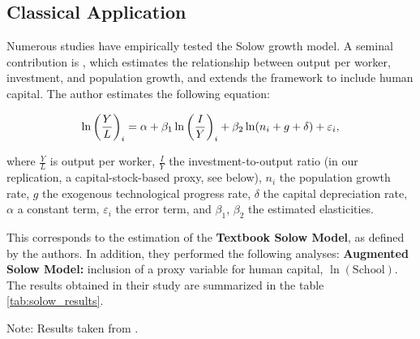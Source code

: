 \documentclass[preprint,12pt,authoryear]{sn-jnl}
\begin{document}
\subsection{Classical Application}

Numerous studies have empirically tested the Solow growth model. A seminal contribution is \cite{mankiw1992contribution}, which estimates the relationship between output per worker, investment, and population growth, and extends the framework to include human capital. The author estimates the following equation:

\begin{equation}
\setlength{\abovedisplayskip}{5pt}
\setlength{\belowdisplayskip}{5pt}
\ln\left(\frac{Y}{L}\right)_i = \alpha + \beta_1 \ln\left(\frac{I}{Y}\right)_i + \beta_2 \ln(n_i + g + \delta) + \varepsilon_i,
\end{equation}

where $\frac{Y}{L}$ is output per worker, $\frac{I}{Y}$ the investment-to-output ratio (in our replication, a capital-stock-based proxy, see below), 
$n_i$ the population growth rate, $g$ the exogenous technological progress rate, 
$\delta$ the capital depreciation rate, $\alpha$ a constant term, 
$\varepsilon_i$ the error term, and $\beta_1$, $\beta_2$ the estimated elasticities. 

This corresponds to the estimation of the \textbf{Textbook Solow Model}, as defined by the authors. In addition, they performed the following analyses: \textbf{Augmented Solow Model:} inclusion of a proxy variable for human capital, $\ln(\text{School})$. The results obtained in their study are summarized in the table \ref{tab:solow_results}.

\begin{table}[htbp]
\caption{Estimation Results for the Solow Model Experiments}
\label{tab:solow_results}
\scriptsize
\begin{threeparttable}
\begin{tablenotes}
\small
\item Note: Results taken from \cite{mankiw1992contribution}.
\end{tablenotes}
\end{threeparttable}
\end{table}
\end{document}
